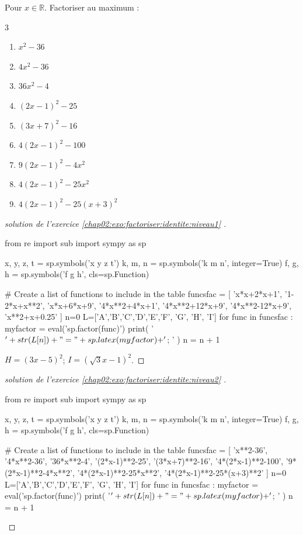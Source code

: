 \begin{exercise}\label{chap02:exo:factoriser:identite:niveau2}  Pour $x\in\mathbb{R}$. Factoriser au maximum  :
	\begin{multicols}{3}
		\begin{enumerate}[label={$\Alph*(x)=$},left= 0pt]
			\item $x^2-36$ 
			\item $4x^2-36$
			\item $36x^2-4$ 
			\item $(2x-1)^2-25$
			\item $(3x+7)^2-16$
			\item $4(2x-1)^2-100$  
			\item $9(2x-1)^2-4x^2$
			\item $4(2x-1)^2-25x^2$  
			\item $4(2x-1)^2-25(x+3)^2$  
		\end{enumerate}
	\end{multicols}
\end{exercise}
\begin{proof}[solution de l'exercice \ref{chap02:exo:factoriser:identite:niveau1} ]  
	\begin{pycode}
from re import sub
import sympy as sp

x, y, z, t = sp.symbols('x y z t')
k, m, n = sp.symbols('k m n', integer=True)
f, g, h = sp.symbols('f g h', cls=sp.Function)

# Create a list of functions to include in the table
funcsfac = [ 
'x*x+2*x+1',
'1-2*x+x**2',
'x*x+6*x+9',
'4*x**2+4*x+1',
'4*x**2+12*x+9',
'4*x**2-12*x+9',
'x**2+x+0.25'  
]
n=0
L=['A','B','C','D','E','F', 'G', 'H', 'I']
for func in funcsfac :  
	myfactor =  eval('sp.factor(func)')
	print( '$'+ str(L[n])  + "=" + sp.latex(myfactor) + '$; ' ) 
	n     = n + 1
\end{pycode}
$H=(3x-5)^2$; $I=(\sqrt{3} x-1)^2$.
\end{proof}
\begin{proof}[solution de l'exercice \ref{chap02:exo:factoriser:identite:niveau2} ]  
	\begin{pycode}
from re import sub
import sympy as sp

x, y, z, t = sp.symbols('x y z t')
k, m, n = sp.symbols('k m n', integer=True)
f, g, h = sp.symbols('f g h', cls=sp.Function)

# Create a list of functions to include in the table
funcsfac = [
'x**2-36',
'4*x**2-36',
'36*x**2-4',
'(2*x-1)**2-25',
'(3*x+7)**2-16',
'4*(2*x-1)**2-100',
'9*(2*x-1)**2-4*x**2',
'4*(2*x-1)**2-25*x**2',
'4*(2*x-1)**2-25*(x+3)**2'
]
n=0
L=['A','B','C','D','E','F', 'G', 'H', 'I']
for func in funcsfac :
	myfactor =  eval('sp.factor(func)')
	print( '$'+ str(L[n])  + "=" + sp.latex(myfactor) + '$; ' )
	n     = n + 1
	\end{pycode}
\end{proof}

%	




